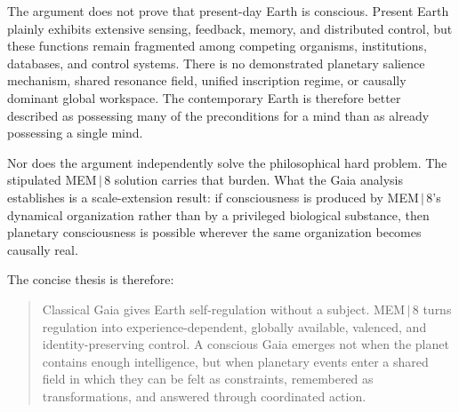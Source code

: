 \documentclass[11pt]{article}
\begin{document}
The argument does not prove that present-day Earth is conscious. Present Earth plainly exhibits extensive sensing, feedback, memory, and distributed control, but these functions remain fragmented among competing organisms, institutions, databases, and control systems. There is no demonstrated planetary salience mechanism, shared resonance field, unified inscription regime, or causally dominant global workspace. The contemporary Earth is therefore better described as possessing many of the preconditions for a mind than as already possessing a single mind.

Nor does the argument independently solve the philosophical hard problem. The stipulated MEM\,$|$\,8 solution carries that burden. What the Gaia analysis establishes is a scale-extension result: if consciousness is produced by MEM\,$|$\,8's dynamical organization rather than by a privileged biological substance, then planetary consciousness is possible wherever the same organization becomes causally real.

The concise thesis is therefore:

\begin{quote}
Classical Gaia gives Earth self-regulation without a subject. MEM\,$|$\,8 turns regulation into experience-dependent, globally available, valenced, and identity-preserving control. A conscious Gaia emerges not when the planet contains enough intelligence, but when planetary events enter a shared field in which they can be felt as constraints, remembered as transformations, and answered through coordinated action.
\end{quote}
\end{document}
